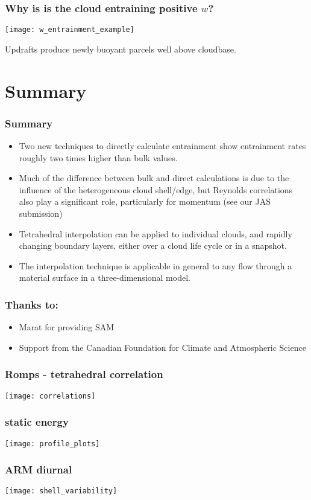 \documentclass[fleqn,hyperref={colorlinks=true,linkcolor=blue,urlcolor=blue},numbers]{beamer}
\begin{document}
\begin{frame}
  \frametitle{Why is is the cloud entraining positive $w$?}

\texttt{[image: w\_entrainment\_example]}

Updrafts produce newly buoyant parcels well above cloudbase.
\end{frame}


\section{Summary}
\label{sec:summary}


\begin{frame}
  \frametitle{ Summary}

  \begin{itemize}
  \item Two new techniques to  directly calculate entrainment show
entrainment rates roughly two times higher than bulk values. \pause
\item Much of the difference between bulk and direct calculations is
due to the influence of the heterogeneous cloud shell/edge, but
Reynolds correlations also play a significant role, particularly
for momentum (see our JAS submission) \pause
\item Tetrahedral interpolation can be applied to individual clouds,
and rapidly changing boundary layers, 
either over a cloud life cycle or in a snapshot. \pause

\item The interpolation technique is applicable in general to any
flow through a material surface in a three-dimensional model.

  \end{itemize}

\end{frame}


\begin{frame}
  \frametitle{Thanks to:}

  \begin{itemize}
  \item Marat for providing SAM
  \item Support from the Canadian Foundation for Climate and Atmospheric Science
  \end{itemize}

\end{frame}


\begin{frame}
\frametitle{Romps - tetrahedral correlation}
\texttt{[image: correlations]}
\end{frame}


\begin{frame}
\frametitle{static energy}
\texttt{[image: profile\_plots]}
\end{frame}


\begin{frame}
\frametitle{ARM diurnal}
\texttt{[image: shell\_variability]}
\end{frame}


 
\end{document}
